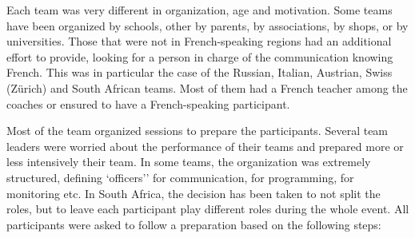 \documentclass{intech-journal}
\begin{document}
Each team was very different in organization, age and motivation.
Some teams have been organized by schools, other by parents, by associations, by shops, or by universities. 
Those that were not in French-speaking regions had an additional effort to provide, looking for a person in charge of the communication knowing French. 
This was in particular the case of the Russian, Italian, Austrian, Swiss (Z\"urich) and South African teams. 
Most of them had a French teacher among the coaches or ensured to have a French-speaking participant. 

Most of the team organized sessions to prepare the participants.
Several team leaders were worried about the performance of their teams and prepared more or less intensively their team.
In some teams, the organization was extremely structured, defining `officers'' for communication, for programming, for monitoring etc.
In South Africa, the decision has been taken to not split the roles, but to leave each participant play different roles during the whole event. 
All participants were asked to follow a preparation based on the following steps:
\end{document}
